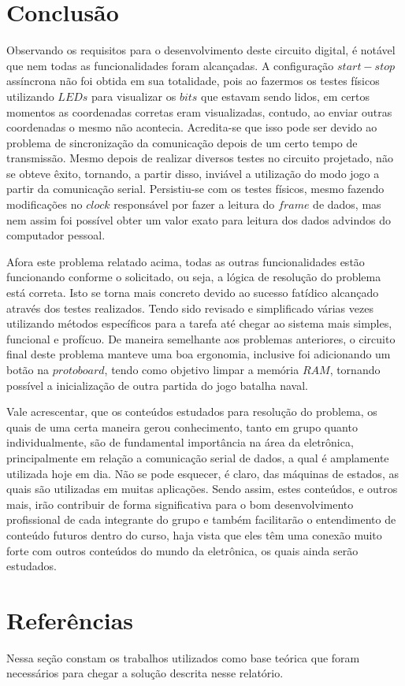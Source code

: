 \documentclass[12pt]{article}
\begin{document}
\section{Conclusão}

Observando os requisitos para o desenvolvimento deste circuito digital, é notável que nem todas as funcionalidades foram alcançadas. A configuração $start-stop$ assíncrona não foi obtida em sua totalidade, pois ao fazermos os testes físicos utilizando $LEDs$ para visualizar os $bits$ que estavam sendo lidos, em certos momentos as coordenadas corretas eram visualizadas, contudo, ao enviar outras coordenadas o mesmo não acontecia. Acredita-se que isso pode ser devido ao problema de sincronização da comunicação depois de um certo tempo de transmissão. Mesmo depois de realizar diversos testes no circuito projetado, não se obteve êxito, tornando, a partir disso, inviável a utilização do modo jogo a partir da comunicação serial. Persistiu-se com os testes físicos, mesmo fazendo modificações no $clock$ responsável por fazer a leitura do $frame$ de dados, mas nem assim foi possível obter um valor exato para leitura dos dados advindos do computador pessoal.


Afora este problema relatado acima, todas as outras funcionalidades estão funcionando conforme o solicitado, ou seja, a lógica de resolução do problema está correta. Isto se torna mais concreto devido ao sucesso fatídico alcançado através dos testes realizados. Tendo sido revisado e simplificado várias vezes utilizando métodos específicos para a tarefa até chegar ao sistema mais simples, funcional e profícuo. De maneira semelhante aos problemas anteriores, o circuito final deste problema manteve uma boa ergonomia, inclusive foi adicionando um botão na $protoboard$, tendo como objetivo limpar a memória $RAM$, tornando possível a inicialização de outra partida do jogo batalha naval. 

Vale acrescentar, que os conteúdos estudados para resolução do problema, os quais de uma certa maneira gerou conhecimento, tanto em grupo quanto individualmente, são de fundamental importância na área da eletrônica, principalmente em relação a comunicação serial de dados, a qual é amplamente utilizada hoje em dia. Não se pode esquecer, é claro, das máquinas de estados, as quais são utilizadas em muitas aplicações. Sendo assim, estes conteúdos, e outros mais, irão contribuir de forma significativa para o bom desenvolvimento profissional de cada integrante do grupo e também facilitarão o entendimento de conteúdo futuros dentro do curso, haja vista que eles têm uma conexão muito forte com outros conteúdos do mundo da eletrônica, os quais ainda serão estudados.


\section{Referências}

Nessa seção constam os trabalhos utilizados como base teórica que foram necessários para chegar a solução descrita nesse relatório.




\end{document}

